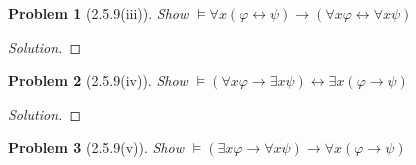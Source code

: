 \documentclass[letter]{article}
\newtheorem{problem}{Problem}
\theoremstyle{definition}
\newenvironment{solution}
{\begin{proof}[Solution]}
        {\end{proof}}
\renewcommand{\phi}{\varphi}
\begin{document}
\begin{problem}[2.5.9(iii)]
    Show $\models \forall x (\phi \leftrightarrow \psi) \to (\forall x \phi \leftrightarrow \forall x \psi)$
\end{problem}
\begin{solution}
\end{solution}

\begin{problem}[2.5.9(iv)]
    Show $\models (\forall x \phi \to \exists x \psi) \leftrightarrow \exists x (\phi \to \psi)$
\end{problem}
\begin{solution}
\end{solution}

\begin{problem}[2.5.9(v)]
    Show $\models (\exists x \phi \to \forall x \psi) \to \forall x (\phi \to \psi)$
\end{problem}
\end{document}
